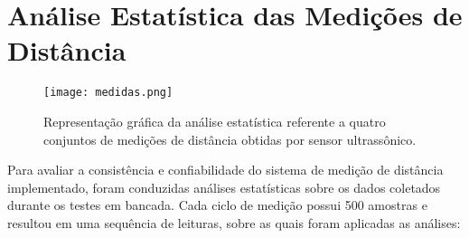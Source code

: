 \documentclass[10pt,conference]{IEEEtran}
\begin{document}
\section{Análise Estatística das Medições de Distância}
\begin{figure}[H]
  \centering
  \texttt{[image: medidas.png]}
  \caption{Representação gráfica da análise estatística referente a quatro conjuntos de medições de distância obtidas por sensor ultrassônico.}
  \label{fig:sistema}
\end{figure}
Para avaliar a consistência e confiabilidade do sistema de medição de distância implementado, foram conduzidas análises estatísticas sobre os dados coletados durante os testes em bancada. Cada ciclo de medição possui 500 amostras e resultou em uma sequência de leituras, sobre as quais foram aplicadas as análises:
\end{document}
